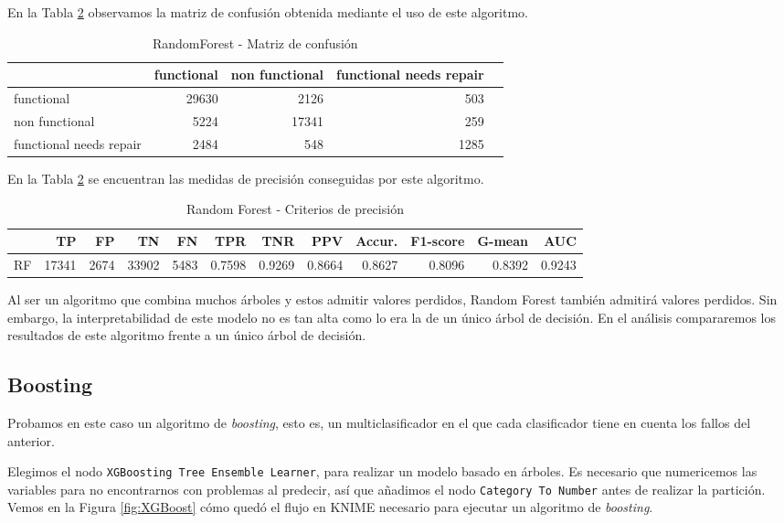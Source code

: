 \documentclass[a4paper, 20pt]{article}
\begin{document}
En la Tabla \ref{tab:RandomForest} observamos la matriz de confusión obtenida mediante el uso de este algoritmo.

\begin{table}[H]
\centering
\caption{RandomForest - Matriz de confusión}
\label{tab:CMRandomForest}
\begin{tabular}{lrrrr}
\toprule
 & functional & non functional & functional needs repair\\ \midrule
functional & 29630 & 2126 & 503\\
non functional & 5224 & 17341 & 259\\
functional needs repair & 2484 & 548 & 1285\\
\bottomrule
\end{tabular}
\end{table}

En la Tabla \ref{tab:RandomForest} se encuentran las medidas de precisión conseguidas por este algoritmo.

\begin{table}[H]
\centering
\caption{Random Forest - Criterios de precisión}
\label{tab:RandomForest}
\begin{tabular}{lrrrrrrrrrrr}
\toprule
 & TP & FP & TN & FN & TPR & TNR & PPV & Accur. & F1-score & G-mean & AUC\\ \midrule
RF & 17341 & 2674 & 33902 & 5483 & 0.7598 & 0.9269 & 0.8664 & 0.8627 & 0.8096 & 0.8392 & 0.9243\\
\bottomrule
\end{tabular}
\end{table}


Al ser un algoritmo que combina muchos árboles y estos admitir valores perdidos, Random Forest también admitirá valores perdidos. Sin embargo, la interpretabilidad de este modelo no es tan alta como lo era la de un único árbol de decisión. En el análisis compararemos los resultados de este algoritmo frente a un único árbol de decisión.


\subsection{Boosting}

Probamos en este caso un algoritmo de \textit{boosting}, esto es, un multiclasificador en el que cada clasificador tiene en cuenta los fallos del anterior.

Elegimos el nodo \texttt{XGBoosting Tree Ensemble Learner}, para realizar un modelo basado en árboles. Es necesario que numericemos las variables para no encontrarnos con problemas al predecir, así que añadimos el nodo \texttt{Category To Number} antes de realizar la partición. Vemos en la Figura \ref{fig:XGBoost} cómo quedó el flujo en KNIME necesario para ejecutar un algoritmo de \textit{boosting}.
\end{document}
